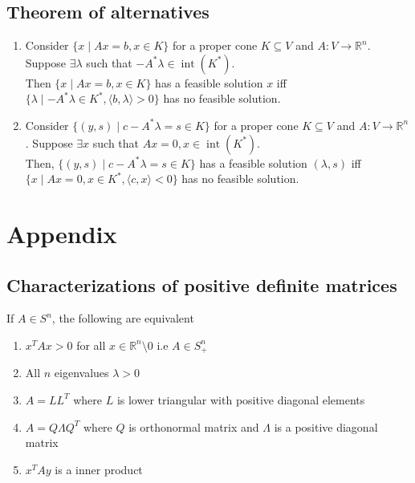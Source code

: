 \documentclass[a4paper,11pt]{article}
\newcommand{\intr}{\operatorname{int}}
\newcommand{\Rn}{\mathbb{R}^n}
\newcommand\inrpd[2]{\langle #1, #2 \rangle}
\begin{document}
\subsection{Theorem of alternatives}
\begin{enumerate}
\item Consider $\{x \mid Ax = b, x\in K \}$ for a proper cone $K \subseteq V$ and $A: V \rightarrow \Rn$. Suppose $\exists \lambda$ such that $-A^* \lambda \in \intr(K^*)$. \\
Then $\{x \mid Ax = b, x\in K \}$ has a  feasible solution $x$ iff $\{\lambda \mid  -A^* \lambda \in K^*, \inrpd{b}{\lambda} >0\}$ has no feasible solution.

\item Consider $\{(y,s) \mid c - A^*\lambda  = s \in K \}$ for a proper cone $K \subseteq V$ and $A: V \rightarrow \Rn$. Suppose $\exists x$ such that $Ax = 0, x \in \intr(K^*)$. \\
Then, $\{(y,s) \mid c - A^*\lambda  = s \in K \}$  has a  feasible solution $(\lambda,s)$ iff $\{x \mid Ax = 0, x\in K^*, \inrpd{c}{x} < 0 \}$ has no feasible solution.
\end{enumerate}








\appendix
\section{Appendix}
\subsection{Characterizations of positive definite matrices}
If $A \in S^n$, the following are equivalent
\begin{enumerate}
\item $x^T A x > 0$ for all $x \in \Rn \setminus{0}$ i.e $A\in S^n_+$
\item All $n$ eigenvalues $\lambda > 0$
\item $A = LL^T$ where $L$ is lower triangular with positive diagonal elements
\item $A = Q\Lambda Q^T$ where $Q$ is orthonormal matrix and $\Lambda$ is a positive diagonal matrix
\item $x^T A y$ is a inner product
\end{enumerate}
\end{document}
